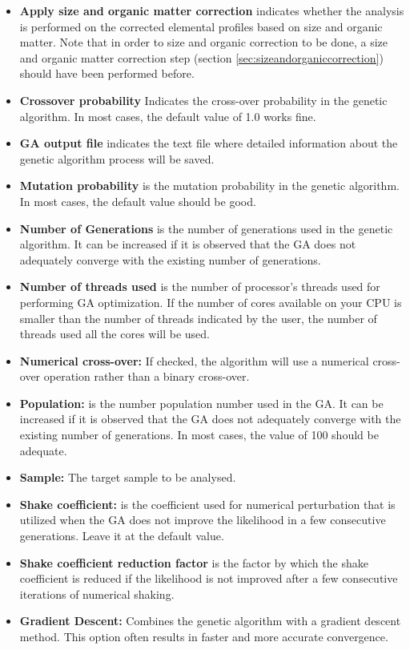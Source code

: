 \documentclass[12pt]{report}
\begin{document}
\begin{itemize}
    \item \textbf{Apply size and organic matter correction} indicates whether the analysis is performed on the corrected elemental profiles based on size and organic matter. Note that in order to size and organic correction to be done, a size and organic matter correction step (section \ref{sec:sizeandorganiccorrection}) should have been performed before. 
    \item \textbf{Crossover probability} Indicates the cross-over probability in the genetic algorithm. In most cases, the default value of 1.0 works fine. 
    \item \textbf{GA output file} indicates the text file where detailed information about the genetic algorithm process will be saved.
    \item \textbf{Mutation probability } is the mutation probability in the genetic algorithm. In most cases, the default value should be good.
    \item \textbf{Number of Generations} is the number of generations used in the genetic algorithm. It can be increased if it is observed that the GA does not adequately converge with the existing number of generations. 
    \item \textbf{Number of threads used} is the number of processor's threads used for performing GA optimization. If the number of cores available on your CPU is smaller than the number of threads indicated by the user, the number of threads used all the cores will be used. 
    \item \textbf{Numerical cross-over: } If checked, the algorithm will use a numerical cross-over operation rather than a binary cross-over. 
    \item \textbf{Population: } is the number population number used in the GA. It can be increased if it is observed that the GA does not adequately converge with the existing number of generations. In most cases, the value of 100 should be adequate. 
    \item \textbf{Sample: } The target sample to be analysed. 
    \item \textbf{Shake coefficient: } is the coefficient used for numerical perturbation that is utilized when the GA does not improve the likelihood in a few consecutive generations. Leave it at the default value. 
    \item \textbf{Shake coefficient reduction factor} is the factor by which the shake coefficient is reduced if the likelihood is not improved after a few consecutive iterations of numerical shaking. 
    \item \textbf{Gradient Descent: } Combines the genetic algorithm with a gradient descent method. This option often results in faster and more accurate convergence. 
\end{itemize}
\end{document}
